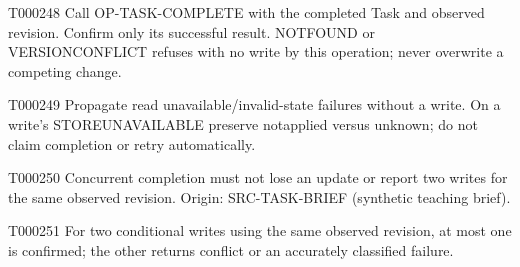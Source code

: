 \documentclass[11pt,a4paper]{article}
\begin{document}
\begin{atlasparagraph}{T000248}
Call OP-TASK-COMPLETE with the completed Task and observed revision. Confirm only its successful result. NOT\AtlasCharUnderscore{}FOUND or VERSION\AtlasCharUnderscore{}CONFLICT refuses with no write by this operation; never overwrite a competing change.
\end{atlasparagraph}
\begin{atlasparagraph}{T000249}
Propagate read unavailable/invalid-state failures without a write. On a write's STORE\AtlasCharUnderscore{}UNAVAILABLE preserve not\AtlasCharUnderscore{}applied versus unknown; do not claim completion or retry automatically.
\end{atlasparagraph}
\begin{atlasparagraph}{T000250}
Concurrent completion must not lose an update or report two writes for the same observed revision. Origin: SRC-TASK-BRIEF (synthetic teaching brief).
\end{atlasparagraph}
\begin{atlasparagraph}{T000251}
For two conditional writes using the same observed revision, at most one is confirmed; the other returns conflict or an accurately classified failure.
\end{atlasparagraph}
\end{document}

